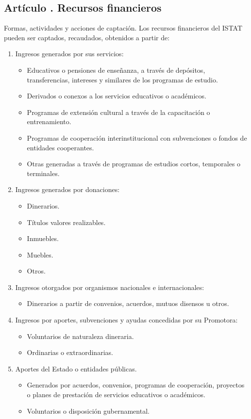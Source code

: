 \subsection{Artículo . Recursos financieros}
\addtocounter{ns}{1}
Formas, actividades y acciones de captación. Los recursos financieros del ISTAT pueden ser captados, recaudados, obtenidos a partir de: 
\begin{enumerate}
\item Ingresos generados por sus servicios:
\begin{itemize}
\item Educativos o pensiones de enseñanza, a través de depósitos, transferencias, intereses y similares de los programas de estudio.
\item Derivados o conexos a los servicios educativos o académicos. 
\item Programas de extensión cultural a través de la capacitación o entrenamiento. 
\item Programas de cooperación interinstitucional con subvenciones o fondos de entidades cooperantes. 
\item Otras generadas a través de programas de estudios cortos, temporales o terminales.
\end{itemize} 
\item Ingresos generados por donaciones: 
\begin{itemize}
\item Dinerarios. 
\item Títulos valores realizables. 
\item Inmuebles. 
\item Muebles. 
\item Otros. 
\end{itemize}
\item Ingresos otorgados por organismos nacionales e internacionales: 
\begin{itemize}
\item Dinerarios a partir de convenios, acuerdos, mutuos disensos u otros. 
\end{itemize}
\item Ingresos por aportes, subvenciones y ayudas concedidas por su Promotora: 
\begin{itemize}
\item Voluntarios de naturaleza dineraria. 
\item Ordinarias o extraordinarias. 
\end{itemize}
\item Aportes del Estado o entidades públicas.
\begin{itemize}
\item Generados por acuerdos, convenios, programas de cooperación, proyectos o planes de prestación de servicios educativos o académicos. 
\item Voluntarios o disposición gubernamental. 
\end{itemize} 
\end{enumerate}
